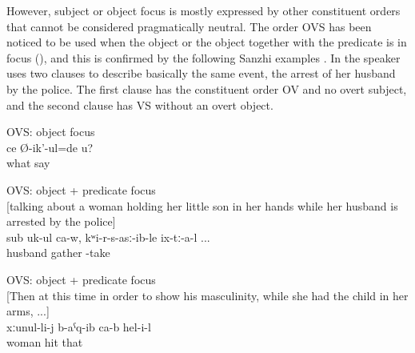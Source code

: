 However, subject or object focus is mostly expressed by other constituent orders that cannot be considered pragmatically neutral. The order OVS has been noticed to be used when the object or the object together with the predicate is in focus (\citealt{Testelec1998a, Testelets.1998c, Forker.Belyaev2016}), and this is confirmed by the following Sanzhi examples . In  the speaker uses two clauses to describe basically the same event, the arrest of her husband by the police. The first clause has the constituent order OV and no overt subject, and the second clause has VS without an overt object.
%
\begin{exe}
	\ex	OVS: object focus \\\label{ex:What do you (masc.) say1}
	\gll	ce	Ø-ik'-ul=de	u?\\
		what	say	\\
	\glt	{}
	
	\ex	OVS: object + predicate focus\\\label{ex:they are taking her husband, took him away OVS}%
		[talking about a woman holding her little son in her hands while her husband is arrested by the police]\\
	\gll	sub	uk-ul	ca-w,	kʷi-r-s-asː-ib-le	ix-tː-a-l ...\\
		husband	gather		-take	\\
	\glt	{}

	\ex	OVS: object + predicate focus\\\label{ex:‎‎Then at this time in order to show his masculinity, while she had the child in her arms, he hit his wife OVS}
	[‎‎Then at this time in order to show his masculinity, while she had the child in her arms, ...]\\
	\gll	xːunul-li-j	b-aˁq-ib	ca-b	hel-i-l\\
		woman	hit		that\\
	\glt	{}
\end{exe}

